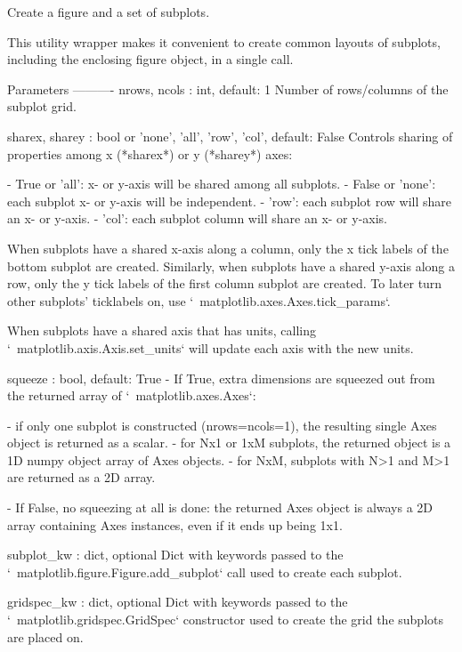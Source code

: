 \begin{DoxyVerb}Create a figure and a set of subplots.

This utility wrapper makes it convenient to create common layouts of
subplots, including the enclosing figure object, in a single call.

Parameters
----------
nrows, ncols : int, default: 1
    Number of rows/columns of the subplot grid.

sharex, sharey : bool or {'none', 'all', 'row', 'col'}, default: False
    Controls sharing of properties among x (*sharex*) or y (*sharey*)
    axes:

    - True or 'all': x- or y-axis will be shared among all subplots.
    - False or 'none': each subplot x- or y-axis will be independent.
    - 'row': each subplot row will share an x- or y-axis.
    - 'col': each subplot column will share an x- or y-axis.

    When subplots have a shared x-axis along a column, only the x tick
    labels of the bottom subplot are created. Similarly, when subplots
    have a shared y-axis along a row, only the y tick labels of the first
    column subplot are created. To later turn other subplots' ticklabels
    on, use `~matplotlib.axes.Axes.tick_params`.

    When subplots have a shared axis that has units, calling
    `~matplotlib.axis.Axis.set_units` will update each axis with the
    new units.

squeeze : bool, default: True
    - If True, extra dimensions are squeezed out from the returned
      array of `~matplotlib.axes.Axes`:

      - if only one subplot is constructed (nrows=ncols=1), the
        resulting single Axes object is returned as a scalar.
      - for Nx1 or 1xM subplots, the returned object is a 1D numpy
        object array of Axes objects.
      - for NxM, subplots with N>1 and M>1 are returned as a 2D array.

    - If False, no squeezing at all is done: the returned Axes object is
      always a 2D array containing Axes instances, even if it ends up
      being 1x1.

subplot_kw : dict, optional
    Dict with keywords passed to the
    `~matplotlib.figure.Figure.add_subplot` call used to create each
    subplot.

gridspec_kw : dict, optional
    Dict with keywords passed to the `~matplotlib.gridspec.GridSpec`
    constructor used to create the grid the subplots are placed on.


\end{DoxyVerb}
